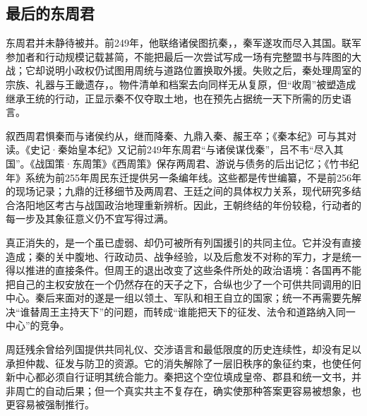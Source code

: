 \subsection{最后的东周君}

东周君并未静待被并。前249年，他联络诸侯图抗秦，，秦军遂攻而尽入其国。联军参加者和行动规模记载甚简，不能把最后一次尝试写成一场有完整盟书与阵图的大战；它却说明小政权仍试图用周统与道路位置换取外援。失败之后，秦处理周室的宗族、礼器与王畿遗存，。物件清单和档案去向同样无从复原，但“收周”被塑造成继承王统的行动，正显示秦不仅夺取土地，也在预先占据统一天下所需的历史语言。

\begin{sourcenote}[王朝终点与残余政权]
叙西周君惧秦而与诸侯约从，继而降秦、九鼎入秦、赧王卒；《秦本纪》可与其对读。《史记·秦始皇本纪》又记前249年东周君“与诸侯谋伐秦”，吕不韦“尽入其国”。《战国策·东周策》《西周策》保存两周君、游说与债务的后出记忆；《竹书纪年》系统为前255年周民东迁提供另一条编年线。这些都是传世编纂，不是前256年的现场记录；九鼎的迁移细节及两周君、王廷之间的具体权力关系，现代研究多结合洛阳地区考古与战国政治地理重新辨析。因此，王朝终结的年份较稳，行动者的每一步及其象征意义仍不宜写得过满。
\end{sourcenote}

真正消失的，是一个虽已虚弱、却仍可被所有列国援引的共同主位。它并没有直接造成；秦的关中腹地、行政动员、战争经验，以及后愈发不对称的军力，才是统一得以推进的直接条件。但周王的退出改变了这些条件所处的政治语境：各国再不能把自己的主权安放在一个仍然存在的天子之下，合纵也少了一个可供共同调用的旧中心。秦后来面对的遂是一组以领土、军队和相王自立的国家；统一不再需要先解决“谁替周王主持天下”的问题，而转成“谁能把天下的征发、法令和道路纳入同一中心”的竞争。

\begin{turningpoint}
周廷残余曾给列国提供共同礼仪、交涉语言和最低限度的历史连续性，却没有足以承担仲裁、征发与防卫的资源。它的消失解除了一层旧秩序的象征约束，也使任何新中心都必须自行证明其统合能力。秦把这个空位填成皇帝、郡县和统一文书，并非周亡的自动后果；但一个真实共主不复存在，确实使那种答案更容易被想象，也更容易被强制推行。
\end{turningpoint}
